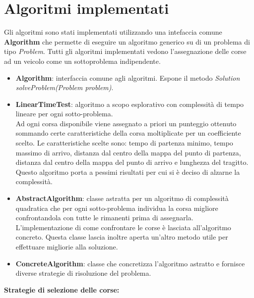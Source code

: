 \documentclass[11pt,a4paper]{article}
\begin{document}
\section{Algoritmi implementati}
Gli algoritmi sono stati implementati utilizzando una intefaccia comune \textbf{Algorithm} che permette di eseguire un algoritmo generico su di un problema di tipo \textit{Problem}.
Tutti gli algoritmi implementati vedono l'assegnazione delle corse ad un veicolo come un sottoproblema indipendente.
 
\begin{itemize}
	\item \textbf{Algorithm}: interfaccia comune agli algoritmi. Espone il metodo \textit{Solution solveProblem(Problem problem)}.
	\item \textbf{LinearTimeTest}: algoritmo a scopo esplorativo con complessità di tempo lineare per ogni sotto-problema. \\
	Ad ogni corsa disponibile viene assegnato a priori un punteggio ottenuto sommando certe caratteristiche della corsa moltiplicate per un coefficiente scelto. Le caratteristiche scelte sono: tempo di partenza minimo, tempo massimo di arrivo, distanza dal centro della mappa del punto di partenza, distanza dal centro della mappa del punto di arrivo e lunghezza del tragitto. \\
	Questo algoritmo porta a pessimi risultati per cui si è deciso di alzarne la complessità.
	\item \textbf{AbstractAlgorithm}: classe astratta per un algoritmo di complessità quadratica che per ogni sotto-problema individua la corsa migliore confrontandola con tutte le rimanenti prima di assegnarla. \\
	L'implementazione di come confrontare le corse è lasciata all'algoritmo concreto. Questa classe lascia inoltre aperta un'altro metodo utile per effettuare migliorie alla soluzione.
	\item \textbf{ConcreteAlgorithm}: classe che concretizza l'algoritmo astratto e fornisce diverse strategie di risoluzione del problema. \\
	\end{itemize}
	\textbf{Strategie di selezione delle corse:}
\end{document}
